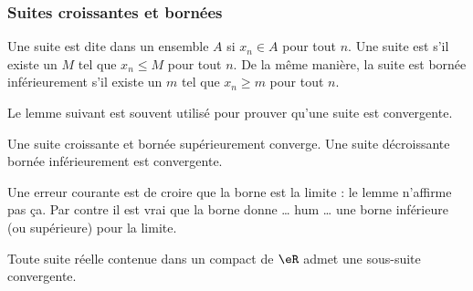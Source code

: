 \subsubsection{Suites croissantes et bornées}

Une suite est dite  dans un ensemble $A$ si $x_n\in A$ pour tout $n$. Une suite est  s'il existe un $M$ tel que $x_n\leq M$ pour tout $n$. De la même manière, la suite est bornée inférieurement s'il existe un $m$ tel que $x_n\geq m$ pour tout $n$.

Le lemme suivant est souvent utilisé pour prouver qu'une suite est convergente.
\begin{lemma}		\label{LemSuiteCrBorncv}
	Une suite croissante et bornée supérieurement converge. Une suite décroissante bornée inférieurement est convergente.
\end{lemma}

Une erreur courante est de croire que la borne est la limite : le lemme n'affirme pas ça. Par contre il est vrai que la borne donne \ldots{} hum \ldots{} une borne inférieure (ou supérieure) pour la limite.

\begin{theorem}     \label{THOooRDYOooJHLfGq}
	Toute suite réelle contenue dans un compact de \( \eR\) admet une sous-suite convergente.
\end{theorem}

